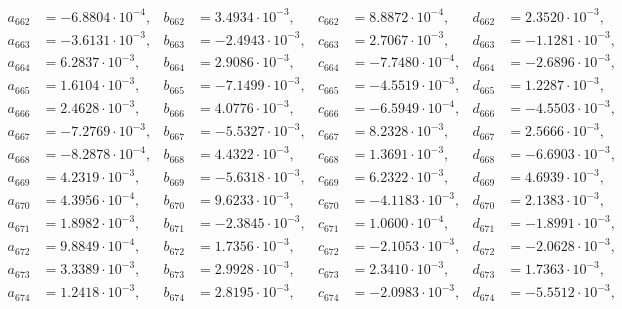 \begin{align*}
  a_{ 662 } &= -6.8804 \cdot 10^{ -4 }, & b_{ 662 } &= 3.4934 \cdot 10^{ -3 }, & c_{ 662 } &= 8.8872 \cdot 10^{ -4 }, & d_{ 662 } &= 2.3520 \cdot 10^{ -3 }, \\ 
  a_{ 663 } &= -3.6131 \cdot 10^{ -3 }, & b_{ 663 } &= -2.4943 \cdot 10^{ -3 }, & c_{ 663 } &= 2.7067 \cdot 10^{ -3 }, & d_{ 663 } &= -1.1281 \cdot 10^{ -3 }, \\ 
  a_{ 664 } &= 6.2837 \cdot 10^{ -3 }, & b_{ 664 } &= 2.9086 \cdot 10^{ -3 }, & c_{ 664 } &= -7.7480 \cdot 10^{ -4 }, & d_{ 664 } &= -2.6896 \cdot 10^{ -3 }, \\ 
  a_{ 665 } &= 1.6104 \cdot 10^{ -3 }, & b_{ 665 } &= -7.1499 \cdot 10^{ -3 }, & c_{ 665 } &= -4.5519 \cdot 10^{ -3 }, & d_{ 665 } &= 1.2287 \cdot 10^{ -3 }, \\ 
  a_{ 666 } &= 2.4628 \cdot 10^{ -3 }, & b_{ 666 } &= 4.0776 \cdot 10^{ -3 }, & c_{ 666 } &= -6.5949 \cdot 10^{ -4 }, & d_{ 666 } &= -4.5503 \cdot 10^{ -3 }, \\ 
  a_{ 667 } &= -7.2769 \cdot 10^{ -3 }, & b_{ 667 } &= -5.5327 \cdot 10^{ -3 }, & c_{ 667 } &= 8.2328 \cdot 10^{ -3 }, & d_{ 667 } &= 2.5666 \cdot 10^{ -3 }, \\ 
  a_{ 668 } &= -8.2878 \cdot 10^{ -4 }, & b_{ 668 } &= 4.4322 \cdot 10^{ -3 }, & c_{ 668 } &= 1.3691 \cdot 10^{ -3 }, & d_{ 668 } &= -6.6903 \cdot 10^{ -3 }, \\ 
  a_{ 669 } &= 4.2319 \cdot 10^{ -3 }, & b_{ 669 } &= -5.6318 \cdot 10^{ -3 }, & c_{ 669 } &= 6.2322 \cdot 10^{ -3 }, & d_{ 669 } &= 4.6939 \cdot 10^{ -3 }, \\ 
  a_{ 670 } &= 4.3956 \cdot 10^{ -4 }, & b_{ 670 } &= 9.6233 \cdot 10^{ -3 }, & c_{ 670 } &= -4.1183 \cdot 10^{ -3 }, & d_{ 670 } &= 2.1383 \cdot 10^{ -3 }, \\ 
  a_{ 671 } &= 1.8982 \cdot 10^{ -3 }, & b_{ 671 } &= -2.3845 \cdot 10^{ -3 }, & c_{ 671 } &= 1.0600 \cdot 10^{ -4 }, & d_{ 671 } &= -1.8991 \cdot 10^{ -3 }, \\ 
  a_{ 672 } &= 9.8849 \cdot 10^{ -4 }, & b_{ 672 } &= 1.7356 \cdot 10^{ -3 }, & c_{ 672 } &= -2.1053 \cdot 10^{ -3 }, & d_{ 672 } &= -2.0628 \cdot 10^{ -3 }, \\ 
  a_{ 673 } &= 3.3389 \cdot 10^{ -3 }, & b_{ 673 } &= 2.9928 \cdot 10^{ -3 }, & c_{ 673 } &= 2.3410 \cdot 10^{ -3 }, & d_{ 673 } &= 1.7363 \cdot 10^{ -3 }, \\ 
  a_{ 674 } &= 1.2418 \cdot 10^{ -3 }, & b_{ 674 } &= 2.8195 \cdot 10^{ -3 }, & c_{ 674 } &= -2.0983 \cdot 10^{ -3 }, & d_{ 674 } &= -5.5512 \cdot 10^{ -3 }, \\ 

\end{align*}
